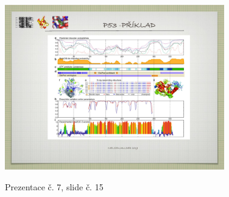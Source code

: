 \documentclass[DIV=8]{scrreprt}
\begin{document}
\begin{figure}
    \caption{Prezentace č. 7, slide č. 15}
    \includegraphics[width=0.85\textwidth]{slides-7/slide-15.jpg}
    \centering
    \label{slides-7-slide-15}
\end{figure}
\end{document}
